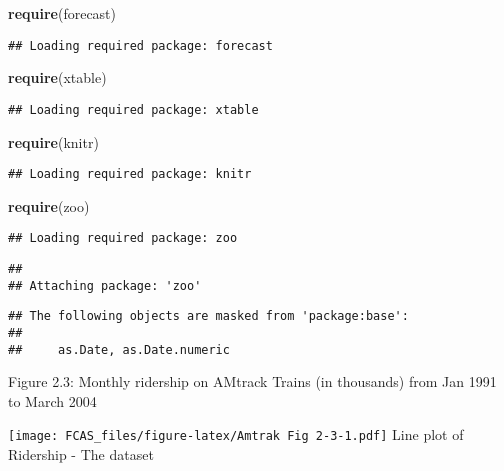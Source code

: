 \documentclass[]{article}
\newenvironment{Shaded}{\begin{snugshade}}{\end{snugshade}}
\newcommand{\KeywordTok}[1]{\textcolor[rgb]{0.13,0.29,0.53}{\textbf{#1}}}
\newcommand{\NormalTok}[1]{#1}
\begin{document}
\begin{Shaded}
\begin{Highlighting}[]
\KeywordTok{require}\NormalTok{(forecast)}
\end{Highlighting}
\end{Shaded}

\begin{verbatim}
## Loading required package: forecast
\end{verbatim}

\begin{Shaded}
\begin{Highlighting}[]
\KeywordTok{require}\NormalTok{(xtable)}
\end{Highlighting}
\end{Shaded}

\begin{verbatim}
## Loading required package: xtable
\end{verbatim}

\begin{Shaded}
\begin{Highlighting}[]
\KeywordTok{require}\NormalTok{(knitr)}
\end{Highlighting}
\end{Shaded}

\begin{verbatim}
## Loading required package: knitr
\end{verbatim}

\begin{Shaded}
\begin{Highlighting}[]
\KeywordTok{require}\NormalTok{(zoo)}
\end{Highlighting}
\end{Shaded}

\begin{verbatim}
## Loading required package: zoo
\end{verbatim}

\begin{verbatim}
## 
## Attaching package: 'zoo'
\end{verbatim}

\begin{verbatim}
## The following objects are masked from 'package:base':
## 
##     as.Date, as.Date.numeric
\end{verbatim}

Figure 2.3: Monthly ridership on AMtrack Trains (in thousands) from Jan
1991 to March 2004

\texttt{[image: FCAS\_files/figure-latex/Amtrak Fig 2-3-1.pdf]} Line plot
of Ridership - The dataset
\end{document}
